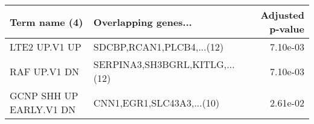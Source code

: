 \begin{tabular}{llr}
\toprule
          Term name (4) &           Overlapping genes... &  Adjusted p-value \\
\midrule
          LTE2 UP.V1 UP &      SDCBP,RCAN1,PLCB4,...(12) &          7.10e-03 \\
           RAF UP.V1 DN & SERPINA3,SH3BGRL,KITLG,...(12) &          7.10e-03 \\
GCNP SHH UP EARLY.V1 DN &      CNN1,EGR1,SLC43A3,...(10) &          2.61e-02 \\
\bottomrule
\end{tabular}
